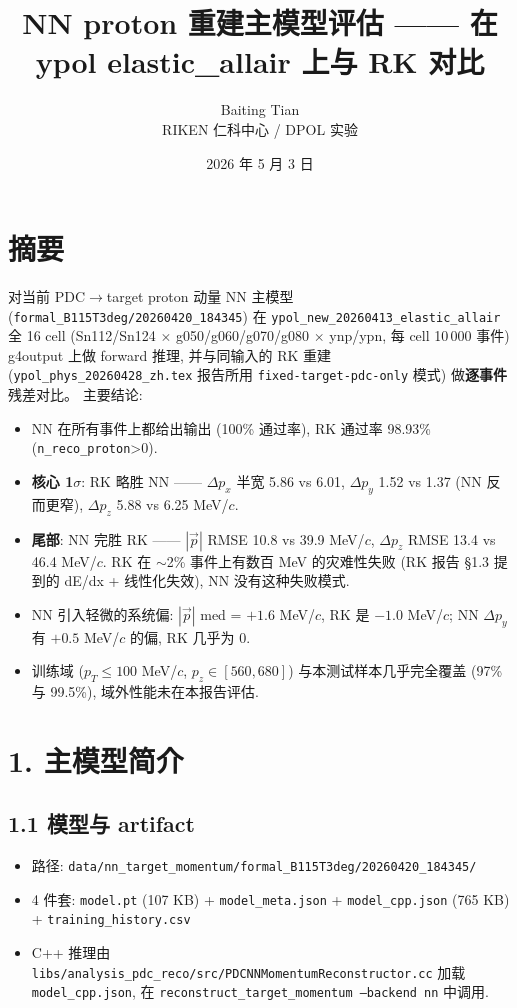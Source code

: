 \documentclass[a4paper,11pt]{article}
\title{\textbf{NN proton 重建主模型评估 —— 在 ypol elastic\_allair 上与 RK 对比}}
\author{Baiting Tian \\ RIKEN 仁科中心 / DPOL 实验}
\date{2026 年 5 月 3 日}
\begin{document}
\maketitle

\section*{摘要}
对当前 PDC$\to$target proton 动量 NN 主模型 (\texttt{formal\_B115T3deg/20260420\_184345}) 在
\texttt{ypol\_new\_20260413\_elastic\_allair} 全 16 cell (Sn112/Sn124 $\times$ g050/g060/g070/g080 $\times$ ynp/ypn,
每 cell 10\,000 事件) g4output 上做 forward 推理, 并与同输入的 RK 重建 (\texttt{ypol\_phys\_20260428\_zh.tex} 报告所用 \texttt{fixed-target-pdc-only} 模式) 做\textbf{逐事件}残差对比。
主要结论:
\begin{itemize}[nosep]
    \item NN 在所有事件上都给出输出 (100\% 通过率), RK 通过率 98.93\% (\texttt{n\_reco\_proton}>0).
    \item \textbf{核心 1$\sigma$}: RK 略胜 NN —— $\Delta p_x$ 半宽 5.86 vs 6.01, $\Delta p_y$ 1.52 vs 1.37 (NN 反而更窄), $\Delta p_z$ 5.88 vs 6.25 MeV/$c$.
    \item \textbf{尾部}: NN 完胜 RK —— $|\vec p|$ RMSE 10.8 vs 39.9 MeV/$c$, $\Delta p_z$ RMSE 13.4 vs 46.4 MeV/$c$. RK 在 $\sim$2\% 事件上有数百 MeV 的灾难性失败 (RK 报告 §1.3 提到的 dE/dx + 线性化失效), NN 没有这种失败模式.
    \item NN 引入轻微的系统偏: $|\vec p|$ med = $+1.6$ MeV/$c$, RK 是 $-1.0$ MeV/$c$; NN $\Delta p_y$ 有 $+0.5$ MeV/$c$ 的偏, RK 几乎为 0.
    \item 训练域 ($p_T\le 100$ MeV/$c$, $p_z\in[560,680]$) 与本测试样本几乎完全覆盖 (97\% 与 99.5\%), 域外性能未在本报告评估.
\end{itemize}

\section{1. 主模型简介}

\subsection{1.1 模型与 artifact}
\begin{itemize}[nosep]
    \item 路径: \texttt{data/nn\_target\_momentum/formal\_B115T3deg/20260420\_184345/}
    \item 4 件套: \texttt{model.pt} (107 KB) + \texttt{model\_meta.json} + \texttt{model\_cpp.json} (765 KB) + \texttt{training\_history.csv}
    \item C++ 推理由 \texttt{libs/analysis\_pdc\_reco/src/PDCNNMomentumReconstructor.cc} 加载 \texttt{model\_cpp.json}, 在 \texttt{reconstruct\_target\_momentum --backend nn} 中调用.
\end{itemize}
\end{document}
